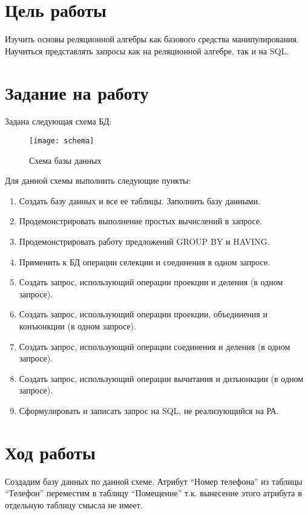 \documentclass[a4paper,14pt]{extarticle}
\begin{document}


\section{Цель работы}
Изучить основы реляционной алгебры как базового средства манипулирования.
Научиться представлять запросы как на реляционной алгебре, так и на SQL.

\section{Задание на работу}
Задана следующая схема БД:
\begin{figure}[H]
    \centering
    \texttt{[image: schema]}
    \caption{Схема базы данных}
    \label{ref:schema}
\end{figure}

Для данной схемы выполнить следующие пункты:
\begin{enumerate}
    \item Создать базу данных и все ее таблицы. Заполнить базу данными.
    \item Продемонстрировать выполнение простых вычислений в запросе.
    \item Продемонстрировать работу предложений GROUP BY и HAVING.
    \item Применить к БД операции селекции и соединения в одном запросе.
    \item Создать запрос, использующий операции проекции и деления (в одном запросе).
    \item Создать запрос, использующий операции проекции, объединения и
          конъюнкции (в одном запросе).
    \item Создать запрос, использующий операции соединения и деления (в одном
          запросе).
    \item Создать запрос, использующий операции вычитания и дизъюнкции (в одном
          запросе).
    \item Сформулировать и записать запрос на SQL, не реализующийся на РА.
\end{enumerate}

\section{Ход работы}
Создадим базу данных по данной схеме. Атрибут \enquote{Номер телефона}
из таблицы \enquote{Телефон} переместим в таблицу \enquote{Помещение}
т.к. вынесение этого атрибута в отдельную таблицу смысла не имеет.
\end{document}
